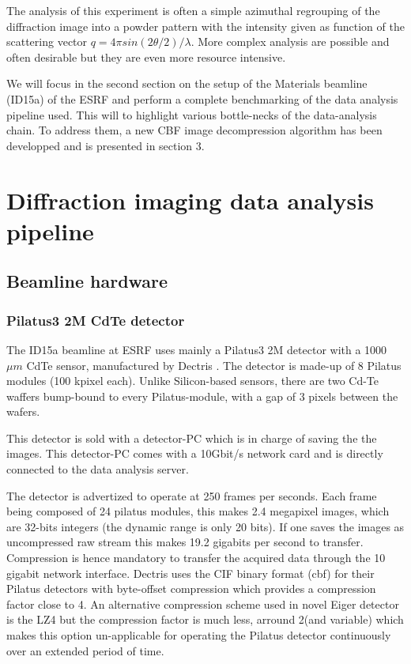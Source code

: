 \documentclass[preprint, pdf]{iucr}              %
\begin{document}
The analysis of this experiment is often a simple azimuthal regrouping of the
diffraction image into a powder pattern with the intensity given as function of
the scattering vector $q=4 \pi sin (2\theta/2)/\lambda$. 
More complex analysis are possible and often desirable but they are even more
resource intensive.

We will focus in the second section on the setup of the Materials beamline
(ID15a) of the ESRF and perform a complete benchmarking of the data analysis 
pipeline used. This will to highlight various bottle-necks of the data-analysis
chain.
To address them, a new CBF image decompression algorithm has been developped and
is presented in section 3. 

\section{Diffraction imaging data analysis pipeline}

\subsection{Beamline hardware}

\subsubsection{Pilatus3 2M CdTe detector}

The ID15a beamline at ESRF uses mainly a Pilatus3 2M detector with a 1000 $\mu
m$ CdTe sensor, manufactured by Dectris \cite{dectris}. 
The detector is made-up of 8 Pilatus modules (100 kpixel each).
Unlike Silicon-based sensors, there are two Cd-Te waffers bump-bound to every
Pilatus-module, with a gap of 3 pixels between the wafers.

This detector is sold with a detector-PC which is in charge of saving the
the images. 
This detector-PC comes with a 10Gbit/s network card and is directly connected to
the data analysis server.

The detector is advertized to operate at 250 frames per seconds. 
Each frame being composed of 24 pilatus modules, this makes 2.4 megapixel
images, which are 32-bits integers (the dynamic range is only 20 bits).
If one saves the images as uncompressed raw stream this makes 19.2 gigabits per
second to transfer.
Compression is hence mandatory to transfer the acquired data through the 10
gigabit network interface.
Dectris uses the CIF binary format (cbf) for their Pilatus detectors with
byte-offset compression which provides a compression factor close to 4\times. 
An alternative compression scheme used in novel Eiger detector is the LZ4 but
the compression factor is much less, arround 2\times (and variable) which makes
this option un-applicable for operating the Pilatus detector continuously over
an extended period of time.
\end{document}
